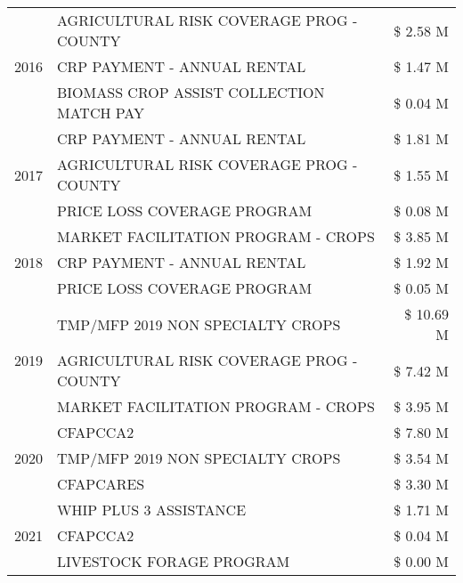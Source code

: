 \begin{tabular}{llr}
\multirow[t]{3}{*}{2016} & AGRICULTURAL RISK COVERAGE PROG - COUNTY & \$ 2.58 M \\
 & CRP PAYMENT - ANNUAL RENTAL & \$ 1.47 M \\
 & BIOMASS CROP ASSIST COLLECTION MATCH PAY & \$ 0.04 M \\
\cline{1-3}
\multirow[t]{3}{*}{2017} & CRP PAYMENT - ANNUAL RENTAL & \$ 1.81 M \\
 & AGRICULTURAL RISK COVERAGE PROG - COUNTY & \$ 1.55 M \\
 & PRICE LOSS COVERAGE PROGRAM & \$ 0.08 M \\
\cline{1-3}
\multirow[t]{3}{*}{2018} & MARKET FACILITATION PROGRAM - CROPS & \$ 3.85 M \\
 & CRP PAYMENT - ANNUAL RENTAL & \$ 1.92 M \\
 & PRICE LOSS COVERAGE PROGRAM & \$ 0.05 M \\
\cline{1-3}
\multirow[t]{3}{*}{2019} & TMP/MFP 2019 NON SPECIALTY CROPS & \$ 10.69 M \\
 & AGRICULTURAL RISK COVERAGE PROG - COUNTY & \$ 7.42 M \\
 & MARKET FACILITATION PROGRAM - CROPS & \$ 3.95 M \\
\cline{1-3}
\multirow[t]{3}{*}{2020} & CFAPCCA2 & \$ 7.80 M \\
 & TMP/MFP 2019 NON SPECIALTY CROPS & \$ 3.54 M \\
 & CFAPCARES & \$ 3.30 M \\
\cline{1-3}
\multirow[t]{3}{*}{2021} & WHIP PLUS 3 ASSISTANCE & \$ 1.71 M \\
 & CFAPCCA2 & \$ 0.04 M \\
 & LIVESTOCK FORAGE PROGRAM & \$ 0.00 M \\
\cline{1-3}
\bottomrule
\end{tabular}
